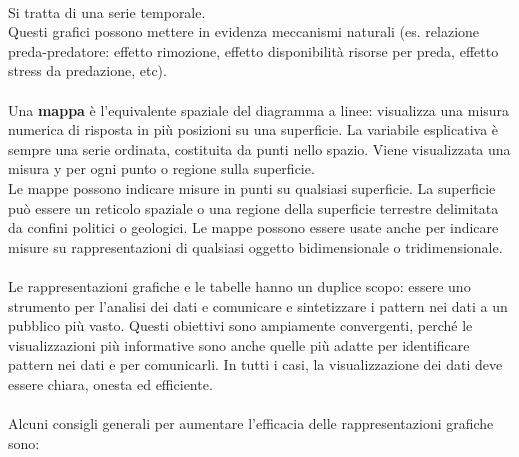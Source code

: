 \documentclass[drafts, 10pt]{book}
\begin{document}
\\
Si tratta di una serie temporale.
\\
Questi grafici possono mettere in evidenza meccanismi naturali (es. relazione preda-predatore: effetto rimozione, effetto disponibilità risorse per preda, effetto stress da predazione, etc).
\\
\\
Una \textbf{mappa} è l'equivalente spaziale del diagramma a linee: visualizza una misura numerica di risposta in più posizioni su una superficie. La variabile esplicativa è sempre una serie ordinata, costituita da punti nello spazio. Viene visualizzata una misura y per ogni punto o regione sulla superficie.
\\
Le mappe possono indicare misure in punti su qualsiasi superficie. La superficie può essere un reticolo spaziale o una regione della superficie terrestre delimitata da confini politici o geologici. Le mappe possono essere usate anche per indicare misure su rappresentazioni di qualsiasi oggetto bidimensionale o tridimensionale.
\\
\\
Le rappresentazioni grafiche e le tabelle hanno un duplice scopo: essere uno strumento per l'analisi dei dati e comunicare e sintetizzare i pattern nei dati a un pubblico più vasto. Questi obiettivi sono ampiamente convergenti, perché le visualizzazioni più informative sono anche quelle più adatte per identificare pattern nei dati e per comunicarli. In tutti i casi, la visualizzazione dei dati deve essere chiara, onesta ed efficiente.
\\
\\
Alcuni consigli generali per aumentare l'efficacia delle rappresentazioni grafiche sono:
\end{document}

